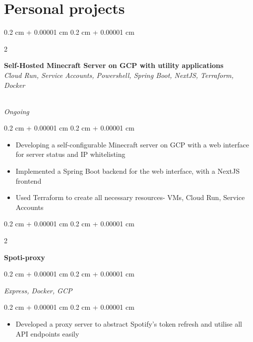 \documentclass[10pt, letterpaper]{article}
\newenvironment{highlights}{
    \begin{itemize}[
        topsep=0.10 cm,
        parsep=0.10 cm,
        partopsep=0pt,
        itemsep=0pt,
        leftmargin=0.4 cm + 10pt
    ]
}{
    \end{itemize}
} %
\newenvironment{onecolentry}{
    \begin{adjustwidth}{
        0.2 cm + 0.00001 cm
    }{
        0.2 cm + 0.00001 cm
    }
}{
    \end{adjustwidth}
} %
\newenvironment{twocolentry}[2][]{
    \onecolentry
    \def\secondColumn{#2}
    \setcolumnwidth{\fill, 4.5 cm}
    \begin{paracol}{2}
}{
    \switchcolumn\raggedleft\secondColumn
    \end{paracol}
    \endonecolentry
} %
\let\hrefWithoutArrow\href
\renewcommand{\href}[2]{\hrefWithoutArrow{#1}{\ifthenelse{\equal{#2}{}}{ }{#2 }\raisebox{.15ex}{\footnotesize \faExternalLink*}}}
\begin{document}
\section{Personal projects}

\begin{twocolentry}{

        \textit{\href{https://github.com/apparentlyarhm/minecraft-terraform}{github}}\\
        \textit{Ongoing}}
    \textbf{Self-Hosted Minecraft Server on GCP with utility applications}\\
    \textit{Cloud Run, Service Accounts, Powershell, Spring Boot, NextJS, Terraform, Docker}
\end{twocolentry}

\vspace{0.2 cm}
\begin{onecolentry}
    \begin{highlights}
        \item{ Developing a self-configurable Minecraft server on GCP with a web interface for server status and IP whitelisting}
        \item {Implemented a Spring Boot backend for the web interface, with a NextJS frontend}
        \item {Used Terraform to create all necessary resources- VMs, Cloud Run, Service Accounts}
    \end{highlights}
\end{onecolentry}

\vspace{0.2 cm}

\begin{twocolentry}                                    {

        \textit{}}
    \textbf{Spoti-proxy}
\end{twocolentry}

\begin{onecolentry}
    \textit{Express, Docker, GCP}
\end{onecolentry}
\vspace{0.2 cm}
\begin{onecolentry}
    \begin{highlights}
        \item {Developed a proxy server to abstract Spotify's token refresh and utilise all API endpoints easily}
    \end{highlights}
\end{onecolentry}

\vspace{0.2 cm}
\end{document}
